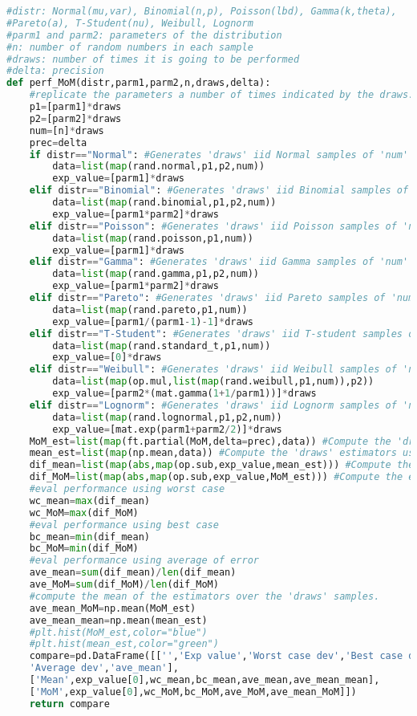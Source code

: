 \documentclass[11pt, english]{article}
\begin{document}
\begin{lstlisting}[language=Python]
#distr: Normal(mu,var), Binomial(n,p), Poisson(lbd), Gamma(k,theta), 
#Pareto(a), T-Student(nu), Weibull, Lognorm
#parm1 and parm2: parameters of the distribution
#n: number of random numbers in each sample
#draws: number of times it is going to be performed
#delta: precision
def perf_MoM(distr,parm1,parm2,n,draws,delta):
	#replicate the parameters a number of times indicated by the draws.    
	p1=[parm1]*draws
	p2=[parm2]*draws
	num=[n]*draws
	prec=delta
	if distr=="Normal": #Generates 'draws' iid Normal samples of 'num' elements
		data=list(map(rand.normal,p1,p2,num)) 
		exp_value=[parm1]*draws
	elif distr=="Binomial": #Generates 'draws' iid Binomial samples of 'num' elements
		data=list(map(rand.binomial,p1,p2,num))
		exp_value=[parm1*parm2]*draws
	elif distr=="Poisson": #Generates 'draws' iid Poisson samples of 'num' elements
		data=list(map(rand.poisson,p1,num))
		exp_value=[parm1]*draws
	elif distr=="Gamma": #Generates 'draws' iid Gamma samples of 'num' elements
		data=list(map(rand.gamma,p1,p2,num))
		exp_value=[parm1*parm2]*draws
	elif distr=="Pareto": #Generates 'draws' iid Pareto samples of 'num' elements
		data=list(map(rand.pareto,p1,num))
		exp_value=[parm1/(parm1-1)-1]*draws
	elif distr=="T-Student": #Generates 'draws' iid T-student samples of 'num' elements
		data=list(map(rand.standard_t,p1,num))
		exp_value=[0]*draws
	elif distr=="Weibull": #Generates 'draws' iid Weibull samples of 'num' elements
		data=list(map(op.mul,list(map(rand.weibull,p1,num)),p2))
		exp_value=[parm2*(mat.gamma(1+1/parm1))]*draws
	elif distr=="Lognorm": #Generates 'draws' iid Lognorm samples of 'num' elements
		data=list(map(rand.lognormal,p1,p2,num))
		exp_value=[mat.exp(parm1+parm2/2)]*draws
	MoM_est=list(map(ft.partial(MoM,delta=prec),data)) #Compute the 'draws' estimators using MoM
	mean_est=list(map(np.mean,data)) #Compute the 'draws' estimators using sample mean
	dif_mean=list(map(abs,map(op.sub,exp_value,mean_est))) #Compute the error of each sample mean
	dif_MoM=list(map(abs,map(op.sub,exp_value,MoM_est))) #Compute the error of each MoM
	#eval performance using worst case    
	wc_mean=max(dif_mean) 
	wc_MoM=max(dif_MoM)
	#eval performance using best case
	bc_mean=min(dif_mean)
	bc_MoM=min(dif_MoM)    
	#eval performance using average of error
	ave_mean=sum(dif_mean)/len(dif_mean)
	ave_MoM=sum(dif_MoM)/len(dif_MoM)
	#compute the mean of the estimators over the 'draws' samples.
	ave_mean_MoM=np.mean(MoM_est)
	ave_mean_mean=np.mean(mean_est)
	#plt.hist(MoM_est,color="blue")
	#plt.hist(mean_est,color="green")
	compare=pd.DataFrame([['','Exp value','Worst case dev','Best case dev',
	'Average dev','ave_mean'],
	['Mean',exp_value[0],wc_mean,bc_mean,ave_mean,ave_mean_mean],
	['MoM',exp_value[0],wc_MoM,bc_MoM,ave_MoM,ave_mean_MoM]])
	return compare

\end{lstlisting}
\end{document}
